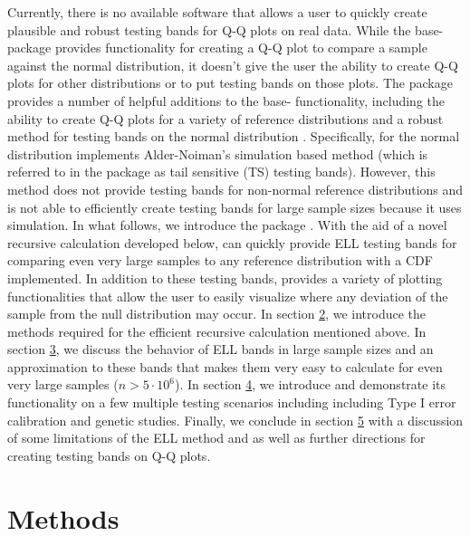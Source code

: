 \documentclass[article]{jss}
\begin{document}
\newline
\newline
Currently, there is no available software that allows a user to quickly create plausible and robust testing bands for Q-Q plots on real data. While the base- package  provides functionality for creating a Q-Q plot to compare a sample against the normal distribution, it doesn't give the user the ability to create Q-Q plots for other distributions or to put testing bands on those plots. The package  provides a number of helpful additions to the base- functionality, including the ability to create Q-Q plots for a variety of reference distributions and a robust method for testing bands on the normal distribution \citep{qqplotr}. Specifically, for the normal distribution  implements Alder-Noiman's simulation based method (which is referred to in the package as tail sensitive (TS) testing bands). However, this method does not provide testing bands for non-normal reference distributions and is not able to efficiently create testing bands for large sample sizes because it uses simulation.
\newline
\newline
In what follows, we introduce the  package . With the aid of a novel recursive calculation developed below,  can quickly provide ELL testing bands for comparing even very large samples to any reference distribution with a CDF implemented. In addition to these testing bands,  provides a variety of plotting functionalities that allow the user to easily visualize where any deviation of the sample from the null distribution may occur. In section \hyperref[sec:methods]{2}, we introduce the methods required for the efficient recursive calculation mentioned above. In section \hyperref[sec:methods]{3}, we discuss the behavior of ELL bands in large sample sizes and an approximation to these bands that makes them very easy to calculate for even very large samples ($n > 5 \cdot 10^{6}$). In section \hyperref[sec:examples]{4}, we introduce  and demonstrate its functionality on a few multiple testing scenarios including including Type I error calibration and genetic studies. Finally, we conclude in section \hyperref[sec:discussion]{5} with a discussion of some limitations of the ELL method and  as well as further directions for creating testing bands on Q-Q plots.
\section{Methods}
\label{sec:methods}
\end{document}
